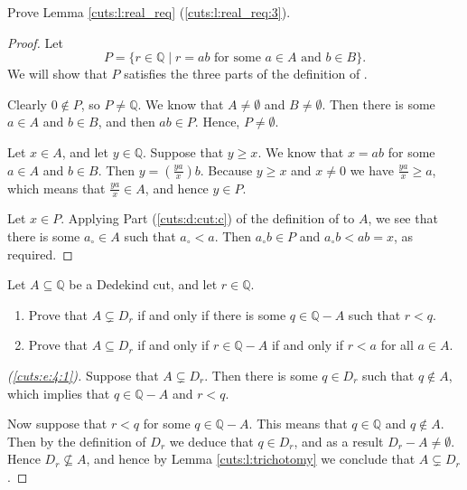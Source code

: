 \Newpage
\begin{exercise} %
	Prove Lemma \ref{cuts:l:real_req} (\ref{cuts:l:real_req:3}).
\end{exercise}

\begin{proof}
	Let
	$$
		P = \{ r \in \mathbb{Q} \mid r = a b \text{ for some } a \in A \text{ and } b \in B \}.
	$$
	We will show that $P$ satisfies the three parts of the definition of .

	 Clearly $0 \notin P$, so $P \not= \mathbb{Q}$. We know that $A \not= \emptyset$ and $B \not= \emptyset$. Then there is some $a \in A$ and $b \in B$, and then $ab \in P$. Hence, $P \not= \emptyset$.

	 Let $x \in A$, and let $y \in \mathbb{Q}$. Suppose that $y \geq x$. We know that $x = a b$ for some $a \in A$ and $b \in B$. Then $y = \left( \frac{y a}{x} \right)  b$. Because $y \geq x$ and $x \not= 0$ we have $\frac{ya}{x} \geq a$, which means that $\frac{ya}{x} \in A$, and hence $y \in P$.

	 Let $x \in P$. Applying Part (\ref{cuts:d:cut:c}) of the definition of  to $A$, we see that there is some $a_\circ \in A$ such that $a_\circ < a$. Then $a_\circ b \in P$ and $a_\circ b < a b = x$, as required.
\end{proof}


\Newpage
\begin{exercise} %
	\label{cuts:e:4}
	Let $A \subseteq \mathbb{Q}$ be a Dedekind cut, and let $r \in \mathbb{Q}$.
	\begin{enumerate}
		\item \label{cuts:e:4:1}
		      Prove that $A \subsetneq D_r$ if and only if there is some $q \in \mathbb{Q} - A$ such that $r < q$.
		\item \label{cuts:e:4:2}
		      Prove that $A \subseteq D_r$ if and only if $r \in \mathbb{Q} - A$ if and only if $r < a$ for all $a \in A$.
	\end{enumerate}
\end{exercise}

\begin{proof}[(\ref{cuts:e:4:1})]
	Suppose that $A \subsetneq D_r$. Then there is some $q \in D_r$ such that $q \notin A$, which implies that $q \in \mathbb{Q} - A$ and $r < q$.

	Now suppose that $r < q$ for some $q \in \mathbb{Q} - A$. This means that $q \in \mathbb{Q}$ and $q \notin A$. Then by the definition of $D_r$ we deduce that $q \in D_r$, and as a result $D_r - A \not= \emptyset$. Hence $D_r \not\subseteq A$, and hence by Lemma \ref{cuts:l:trichotomy} we conclude that $A \subsetneq D_r$.
\end{proof}

